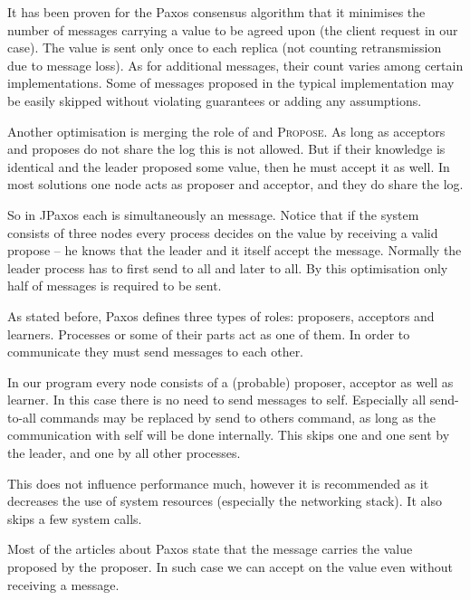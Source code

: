 It has been proven for the Paxos consensus algorithm that it minimises the number of messages carrying a value to be agreed upon (the client request in our case). The value is sent only once to each replica (not counting retransmission due to message loss). As for additional messages, their count varies among certain implementations. Some of messages proposed in the typical implementation may be easily skipped without violating guarantees or adding any assumptions.


Another optimisation is merging the role of \accept and \textsc{Propose}. As long as acceptors and proposes do not share the log this is not allowed. But if their knowledge is identical and the leader proposed some value, then he must accept it as well. In most solutions one node acts as proposer and acceptor, and they do share the log.

So in JPaxos each \propose is simultaneously an \accept message. Notice that if the system consists of three nodes every process decides on the value by receiving a valid propose -- he knows that the leader and it itself %
accept the message. Normally the leader process has to first send \propose to all and later \accept to all. By this optimisation only half of messages is required to be sent.


As stated before, Paxos defines three types of roles: proposers, acceptors and learners. Processes or some of their parts act as one of them. In order to communicate they must send messages to each other.

In our program every node consists of a (probable) proposer, acceptor as well as learner. In this case there is no need to send messages to self. Especially all send-to-all commands may be replaced by send to others command, as long as the communication with self will be done internally. This skips one \accept and one \propose sent by the leader, and one \accept by all other processes.

This does not influence performance much, however it is recommended as it decreases the use of system resources (especially the networking stack). It also skips a few system calls.


Most of the articles about Paxos state that the \accept message carries the value proposed by the proposer. %
In such case we can accept on the value even without receiving a \propose message.

